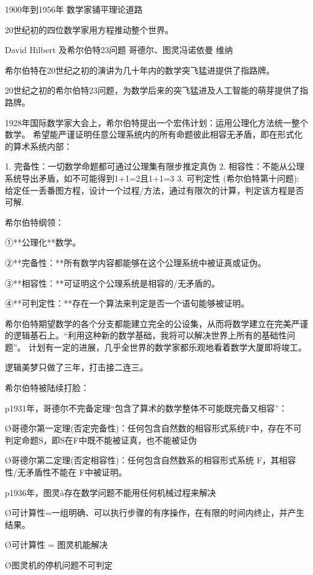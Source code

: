 
1900年到1956年
数学家铺平理论道路

20世纪初的四位数学家用方程推动整个世界。

David Hilbert 及希尔伯特23问题
哥德尔、图灵冯诺依曼  维纳



希尔伯特在20世纪之初的演讲为几十年内的数学突飞猛进提供了指路牌。

20世纪之初的希尔伯特23问题，为数学后来的突飞猛进及人工智能的萌芽提供了指路牌。

1928年国际数学家大会上，希尔伯特提出一个宏伟计划：运用公理化方法统一整个数学。
希望能严谨证明任意公理系统内的所有命题彼此相容无矛盾，即在形式化的算术系统内部：

1. 完备性：一切数学命题都可通过公理集有限步推定真伪
2. 相容性：不能从公理系统导出矛盾，如不可能得到1+1=2且1+1=3
3. 可判定性 (希尔伯特第十问题): 给定任一丢番图方程，设计一个过程/方法，通过有限次的计算，判定该方程是否可解.



希尔伯特纲领：

①**公理化**数学。

②**完备性：**所有数学内容都能够在这个公理系统中被证真或证伪。

③**相容性：**可证明这个公理系统是相容的/无矛盾的。

④**可判定性：**存在一个算法来判定是否一个语句能够被证明。



希尔伯特期望数学的各个分支都能建立完全的公设集，从而将数学建立在完美严谨的逻辑基石上。“利用这种新的数学基础，我将可以解决世界上所有的基础性问题”。
计划有一定的进展，几乎全世界的数学家都乐观地看着数学大厦即将竣工。

逻辑美梦只做了三年，打击接二连三。



希尔伯特被陆续打脸：

p1931年，哥德尔不完备定理“包含了算术的数学整体不可能既完备又相容”：

Ø哥德尔第一定理(否定完备性)：任何包含自然数的相容形式系统F中，存在不可判定命题S，即S在F中既不能被证真，也不能被证伪

Ø哥德尔第二定理(否定相容性)：任何包含自然数系的相容形式系统 F，其相容性/无矛盾性不能在 F中被证明。

p1936年，图灵à存在数学问题不能用任何机械过程来解决

Ø可计算性=一组明确、可以执行步骤的有序操作，在有限的时间内终止，并产生结果。

Ø可计算性 = 图灵机能解决

Ø图灵机的停机问题不可判定

